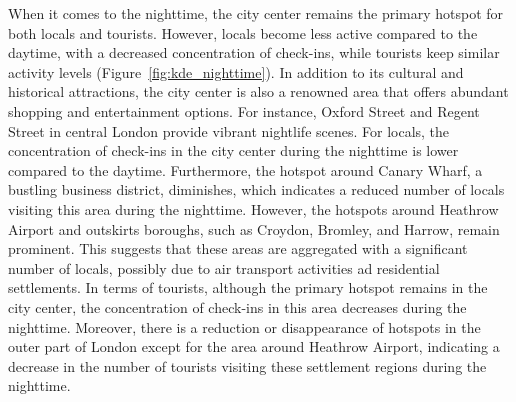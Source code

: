 \documentclass{article}
\theoremstyle{remark}
\begin{document}
When it comes to the nighttime, the city center remains the primary hotspot for both locals and tourists. However, locals become less active compared to the daytime, with a decreased concentration of check-ins, while tourists keep similar activity levels (Figure~\ref{fig:kde_nighttime}). In addition to its cultural and historical attractions, the city center is also a renowned area that offers abundant shopping and entertainment options. For instance, Oxford Street and Regent Street in central London provide vibrant nightlife scenes. For locals, the concentration of check-ins in the city center during the nighttime is lower compared to the daytime. Furthermore, the hotspot around Canary Wharf, a bustling business district, diminishes, which indicates a reduced number of locals visiting this area during the nighttime. However, the hotspots around Heathrow Airport and outskirts boroughs, such as Croydon, Bromley, and Harrow, remain prominent. This suggests that these areas are aggregated with a significant number of locals, possibly due to air transport activities ad residential settlements. In terms of tourists, although the primary hotspot remains in the city center, the concentration of check-ins in this area decreases during the nighttime. Moreover, there is a reduction or disappearance of hotspots in the outer part of London except for the area around Heathrow Airport, indicating a decrease in the number of tourists visiting these settlement regions during the nighttime.
\end{document}
